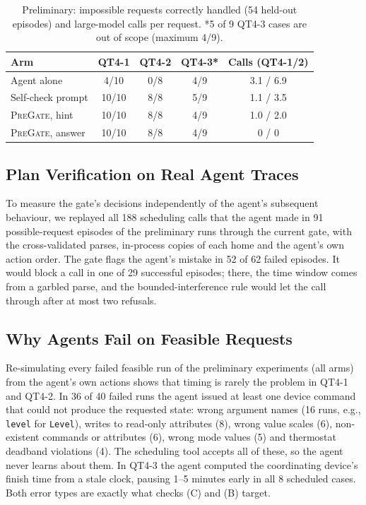 \documentclass[sigconf]{aamas}
\newcommand{\sys}{\textsc{PreGate}}
\begin{document}
\begin{table}[t]
  \caption{Preliminary: impossible requests correctly handled (54 held-out episodes) and large-model calls per
  request. *5 of 9 QT4-3 cases are out of scope (maximum 4/9).}
  \label{tab:prelim}
  \centering\small
  \begin{tabular}{lcccc}
    \toprule
    Arm & QT4-1 & QT4-2 & QT4-3* & Calls (QT4-1/2) \\
    \midrule
    Agent alone & 4/10 & 0/8 & 4/9 & 3.1 / 6.9 \\
    Self-check prompt & 10/10 & 8/8 & 5/9 & 1.1 / 3.5 \\
    \sys{}, hint & 10/10 & 8/8 & 4/9 & 1.0 / 2.0 \\
    \sys{}, answer & 10/10 & 8/8 & 4/9 & 0 / 0 \\
    \bottomrule
  \end{tabular}
\end{table}

\subsection{Plan Verification on Real Agent Traces}

To measure the gate's decisions independently of the agent's subsequent behaviour, we replayed all 188 scheduling
calls that the agent made in 91 possible-request episodes of the preliminary runs through the current gate, with
the cross-validated parses, in-process copies of each home and the agent's own action order. The gate flags the
agent's mistake in 52 of 62 failed episodes. It would block a call in one of 29 successful episodes; there, the
time window comes from a garbled parse, and the bounded-interference rule would let the call through after at
most two refusals.

\subsection{Why Agents Fail on Feasible Requests}

Re-simulating every failed feasible run of the preliminary experiments (all arms) from the agent's own actions
shows that timing is rarely the problem in QT4-1 and QT4-2. In 36 of 40 failed runs the agent issued at least one device command that could
not produce the requested state: wrong argument names (16 runs, e.g., \texttt{level} for \texttt{Level}),
writes to read-only attributes (8), wrong value scales (6), non-existent commands or attributes (6), wrong mode
values (5) and thermostat deadband violations (4). The scheduling tool accepts all of these, so the agent never
learns about them. In QT4-3 the agent computed the coordinating device's finish time from a stale clock, pausing
1--5 minutes early in all 8 scheduled cases. Both error types are exactly what checks (C) and (B) target.
\end{document}
